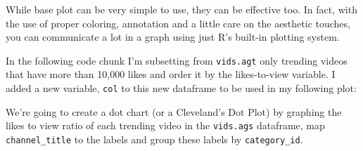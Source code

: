 \documentclass[]{article}
\newenvironment{Shaded}{\begin{snugshade}}{\end{snugshade}}
\newcommand{\CommentTok}[1]{\textcolor[rgb]{0.56,0.35,0.01}{\textit{#1}}}
\newcommand{\DataTypeTok}[1]{\textcolor[rgb]{0.13,0.29,0.53}{#1}}
\newcommand{\DecValTok}[1]{\textcolor[rgb]{0.00,0.00,0.81}{#1}}
\newcommand{\KeywordTok}[1]{\textcolor[rgb]{0.13,0.29,0.53}{\textbf{#1}}}
\newcommand{\NormalTok}[1]{#1}
\newcommand{\OperatorTok}[1]{\textcolor[rgb]{0.81,0.36,0.00}{\textbf{#1}}}
\newcommand{\StringTok}[1]{\textcolor[rgb]{0.31,0.60,0.02}{#1}}
\begin{document}
While base plot can be very simple to use, they can be effective too. In
fact, with the use of proper coloring, annotation and a little care on
the aesthetic touches, you can communicate a lot in a graph using just
R's built-in plotting system.

In the following code chunk I'm subsetting from \texttt{vids.agt} only
trending videos that have more than 10,000 likes and order it by the
likes-to-view variable. I added a new variable, \texttt{col} to this new
dataframe to be used in my following plot:

\begin{Shaded}
\end{Shaded}

We're going to create a dot chart (or a Cleveland's Dot Plot) by
graphing the likes to view ratio of each trending video in the
\texttt{vids.ags} dataframe, map \texttt{channel\_title} to the labels
and group these labels by \texttt{category\_id}.

\begin{Shaded}
\end{Shaded}
\end{document}
